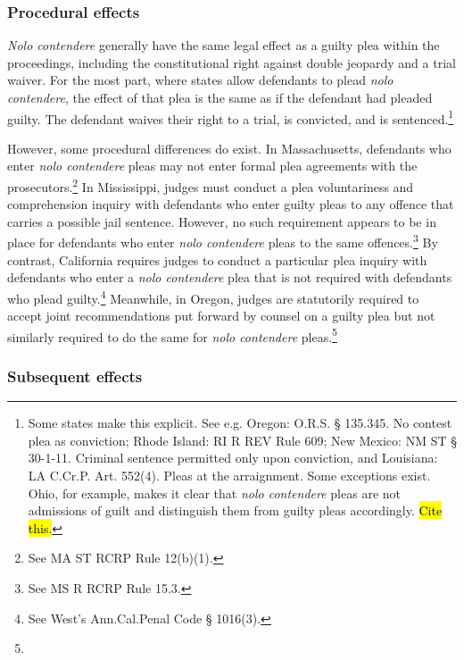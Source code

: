 \subsubsection{Procedural effects}

\textit{Nolo contendere} generally have the same legal effect as a guilty plea within the proceedings, including the constitutional right against double jeopardy and a trial waiver. For the most part, where states allow defendants to plead \textit{nolo contendere}, the effect of that plea is the same as if the defendant had pleaded guilty. The defendant waives their right to a trial, is convicted, and is sentenced.\footnote{Some states make this explicit. See e.g. Oregon: O.R.S. § 135.345. No contest plea as conviction; Rhode Island: RI R REV Rule 609; New Mexico: NM ST § 30-1-11. Criminal sentence permitted only upon conviction, and Louisiana: LA C.Cr.P. Art. 552(4). Pleas at the arraignment. Some exceptions exist. Ohio, for example, makes it clear that \textit{nolo contendere} pleas are not admissions of guilt and distinguish them from guilty pleas accordingly. \hl{Cite this.}}

However, some procedural differences do exist. In Massachusetts, defendants who enter \textit{nolo contendere} pleas may not enter formal plea agreements with the prosecutors.\footnote{See MA ST RCRP Rule 12(b)(1).} In Mississippi, judges must conduct a plea voluntariness and comprehension inquiry with defendants who enter guilty pleas to any offence that carries a possible jail sentence. However, no such requirement appears to be in place for defendants who enter \textit{nolo contendere} pleas to the same offences.\footnote{See MS R RCRP Rule 15.3.} By contrast, California requires judges to conduct a particular plea inquiry with defendants who enter a \textit{nolo contendere} plea that is not required with defendants who plead guilty.\footnote{See West's Ann.Cal.Penal Code § 1016(3).} Meanwhile, in Oregon, judges are statutorily required to accept joint recommendations put forward by counsel on a guilty plea but not similarly required to do the same for \textit{nolo contendere} pleas.\footnote{}

\subsubsection{Subsequent effects}

